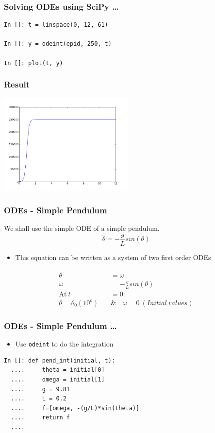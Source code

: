 \documentclass[14pt,compress]{beamer}
\newcommand{\typ}[1]{\lstinline{#1}}
\begin{document}
\begin{frame}[fragile]
\frametitle{Solving ODEs using SciPy \ldots}
\begin{lstlisting}
In []: t = linspace(0, 12, 61)

In []: y = odeint(epid, 250, t)

In []: plot(t, y)
\end{lstlisting}
\end{frame}

\begin{frame}[fragile]
\frametitle{Result}
\begin{center}
\includegraphics[height=2in, interpolate=true]{data/image}  
\end{center}
\end{frame}


\begin{frame}[fragile]
\frametitle{ODEs - Simple Pendulum}
We shall use the simple ODE of a simple pendulum. 
\begin{equation*}
\ddot{\theta} = -\frac{g}{L}sin(\theta)
\end{equation*}
\begin{itemize}
\item This equation can be written as a system of two first order ODEs
\end{itemize}
\begin{align}
\dot{\theta} &= \omega \\
\dot{\omega} &= -\frac{g}{L}sin(\theta) \\
 \text{At}\ t &= 0 : \nonumber \\
 \theta = \theta_0(10^o)\quad & \&\quad  \omega = 0\ (Initial\ values)\nonumber 
\end{align}
\end{frame}

\begin{frame}[fragile]
\frametitle{ODEs - Simple Pendulum \ldots}
\begin{itemize}
\item Use \typ{odeint} to do the integration
\end{itemize}
\begin{lstlisting}
In []: def pend_int(initial, t):
  ....     theta = initial[0]
  ....     omega = initial[1]
  ....     g = 9.81
  ....     L = 0.2
  ....     f=[omega, -(g/L)*sin(theta)]
  ....     return f
  ....
\end{lstlisting}
\end{frame}
\end{document}
